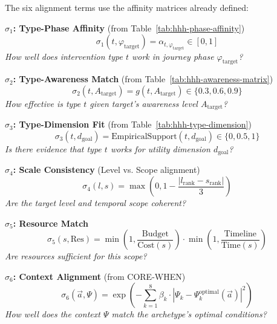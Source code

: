 \begin{tcolorbox}[colback=orange!5!white, colframe=orange!75!black,
    title=\textbf{The Affinity Components $\alpha_{a_i, k_i}$}]

The six alignment terms use the affinity matrices already defined:

\medskip
\textbf{$\sigma_1$: Type-Phase Affinity} (from Table~\ref{tab:hhh-phase-affinity})
\begin{equation}
\sigma_1(t, \varphi_{\text{target}}) = \alpha_{t, \varphi_{\text{target}}} \in [0, 1]
\end{equation}
\textit{How well does intervention type $t$ work in journey phase $\varphi_{\text{target}}$?}

\medskip
\textbf{$\sigma_2$: Type-Awareness Match} (from Table~\ref{tab:hhh-awareness-matrix})
\begin{equation}
\sigma_2(t, A_{\text{target}}) = g(t, A_{\text{target}}) \in \{0.3, 0.6, 0.9\}
\end{equation}
\textit{How effective is type $t$ given target's awareness level $A_{\text{target}}$?}

\medskip
\textbf{$\sigma_3$: Type-Dimension Fit} (from Table~\ref{tab:hhh-type-dimension})
\begin{equation}
\sigma_3(t, d_{\text{goal}}) = \text{EmpiricalSupport}(t, d_{\text{goal}}) \in \{0, 0.5, 1\}
\end{equation}
\textit{Is there evidence that type $t$ works for utility dimension $d_{\text{goal}}$?}

\medskip
\textbf{$\sigma_4$: Scale Consistency} (Level vs. Scope alignment)
\begin{equation}
\sigma_4(l, s) = \max\left(0, 1 - \frac{|l_{\text{rank}} - s_{\text{rank}}|}{3}\right)
\end{equation}
\textit{Are the target level and temporal scope coherent?}

\medskip
\textbf{$\sigma_5$: Resource Match}
\begin{equation}
\sigma_5(s, \text{Res}) = \min\left(1, \frac{\text{Budget}}{\text{Cost}(s)}\right) \cdot \min\left(1, \frac{\text{Timeline}}{\text{Time}(s)}\right)
\end{equation}
\textit{Are resources sufficient for this scope?}

\medskip
\textbf{$\sigma_6$: Context Alignment} (from CORE-WHEN)
\begin{equation}
\sigma_6(\vec{a}, \Psi) = \exp\left(-\sum_{k=1}^{8} \beta_k \cdot |\Psi_k - \Psi_k^{\text{optimal}}(\vec{a})|^2\right)
\end{equation}
\textit{How well does the context $\Psi$ match the archetype's optimal conditions?}

\end{tcolorbox}

